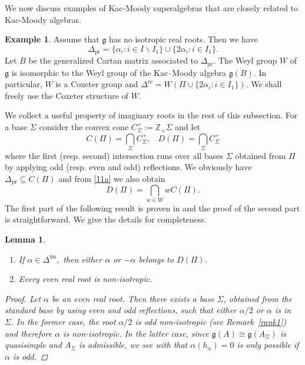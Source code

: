 \documentclass[11pt,reqno]{amsart}
\theoremstyle{plain}
\newtheorem*{lemma}{Lemma}
\theoremstyle{definition}
\newtheorem*{example}{Example}
\theoremstyle{remark}
\newcommand{\lie}[1]{\mathfrak{#1}}
\newcommand\bz{\mathbb Z}
\numberwithin{equation}{section}
\begin{document}
  We now discuss examples of Kac-Moody superalgebras that are closely related to Kac-Moody algebras.
 \begin{example}\label{examnoniso}
     Assume that $\mathfrak g$ has no isotropic real roots. Then we have $$\Delta_{\mathrm{pr}}=\{\alpha_i:i\in I\backslash I_1\}\cup\{2\alpha_i:i\in I_1\}.$$ 
     Let $B$ be the generalized Cartan matrix associated to $\Delta_{\mathrm{pr}}$. The Weyl group $W$ of $\mathfrak g$ is isomorphic to the Weyl group of the Kac–Moody algebra $\mathfrak g(B)$. In particular, $W$ is a Coxeter group and
     $\Delta^{\mathrm{re}}=W(\Pi\cup\{2\alpha_i:i\in I_1\}).$ We shall freely use the Coxeter structure of $W$.
 \end{example}
We collect a useful property of imaginary roots in the rest of this subsection. For a base $\Sigma$ consider the convex cone $C_\Sigma^+:=\bz_{+}\Sigma$ and let 
 $$C(\Pi)=\bigcap_{\Sigma}C_\Sigma^+,\ \ \ \  D(\Pi)=\bigcap_{\Sigma}C_\Sigma^+$$ where the first (resp. second) intersection runs over all bases $\Sigma$ obtained from $\Pi$ by applying odd (resp. even and odd) reflections. We obviously have $\Delta_{\mathrm{pr}}\subseteq C(\Pi)$ and  
 from \eqref{11a} we also obtain $$D(\Pi)=\bigcap_{w\in W}wC(\Pi).$$
 The first part of the following result is proven in \cite[Corollary 4.12]{Serganova11KacMoody} and the proof of the second part is straightforward. We give the details for completeness.
 \begin{lemma}\label{lemimroots}
 \begin{enumerate}
     \item If $\alpha\in \Delta^{\mathrm{im}},$ then either $\alpha$ or $-\alpha$ belongs to $D(\Pi).$
     \item Every even real root is non-isotropic.
 \end{enumerate}
    \begin{proof}
    Let $\alpha$ be an even real root. Then there exists a base $\Sigma$, obtained from the standard base by using even and odd reflections, such that either $\alpha/2$ or $\alpha$ is in $\Sigma.$ 
    In the former case, the root $\alpha/2$ is odd non-isotropic (see Remark~\ref{rank1}) and therefore $\alpha$ is non-isotropic. In the latter case, since $\lie g(A)\cong \lie g(A_{\Sigma})$ is quasisimple and $A_{\Sigma}$ is admissible, we see with \cite[Lemma 2.3]{Serganova11KacMoody} that $\alpha(h_\alpha)=0$ is only possible if $\alpha$ is odd.
\end{proof}
 \end{lemma}
\end{document}
